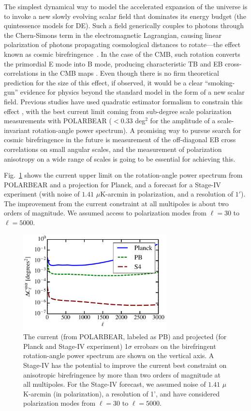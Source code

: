 The simplest dynamical way to model the accelerated expansion of the universe is to invoke a new slowly evolving scalar field that dominates its energy budget (the quintessence models for DE). Such a field generically couples to photons through the Chern-Simons term in the electromagnetic Lagrangian, causing linear polarization of photons propagating cosmological distances to rotate---the effect known as cosmic birefringence~\cite{Carroll:1998zi}. In the case of the CMB, such rotation converts the primordial E mode into B mode, producing characteristic TB and EB cross-correlations in the CMB maps \cite{Kamionkowski:2008fp,Gluscevic:2009mm}. Even though there is no firm theoretical prediction for the size of this effect, if observed, it would be a clear “smoking-gun” evidence for physics beyond the standard model in the form of a new scalar field. Previous studies have used quadratic estimator formalism to constrain this effect \cite{Gluscevic:2012me}, with the best current limit coming from sub-degree scale polarization measurements with POLARBEAR \cite{Ade:2015cao} ($<0.33$ deg$^2$ for the amplitude of a scale-invariant rotation-angle power spectrum). A promising way to pursue search for cosmic birefringence in the future is measurement of the off-diagonal EB cross correlations on small angular scales, and the measurement of polarization anisotropy on a wide range of scales is going to be essential for achieving this. 

Fig.~\ref{fig:CB-forecast} shows the current upper limit on the rotation-angle power spectrum from POLARBEAR and a projection for Planck, and a forecast for a Stage-IV experiment (with noise of $1.41$ $\mu$K-arcmin in polarization, and a resolution of $1'$). The improvement from the current constraint at all multipoles is about two orders of magnitude. We assumed access to polarization modes from $\ell=30$ to $\ell=5000$.
\begin{figure}[h!]
\centering \includegraphics[width=0.70\textwidth]{DarkEnergy/birefringence-S4-planck-PB-v2.pdf}
\caption{The current (from POLARBEAR, labeled as PB) and projected (for Planck and Stage-IV experiment) 1$\sigma$ errobars on the birefringent rotation-angle power spectrum are shown on the vertical axis. A Stage-IV has the potential to improve the current best constraint on anisotropic birefringence by more than two orders of magnitude at all multipoles. For the Stage-IV forecast, we assumed noise of $1.41$ $\mu$K-arcmin (in polarization), a resolution of 1', and have considered polarization modes from $\ell=30$ to $\ell=5000$.}
\label{fig:CB-forecast}
\end{figure}

